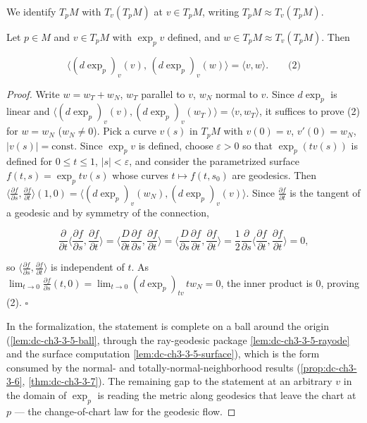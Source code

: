 \begin{lemma}[Gauss]
  \label{lem:dc-ch3-3-5}
  \notready
  We identify $T_pM$ with $T_v(T_pM)$ at $v\in T_pM$, writing $T_pM\approx T_v(T_pM)$.
  
  Let $p\in M$ and $v\in T_pM$ with $\exp_p v$ defined, and $w\in T_pM\approx T_v(T_pM)$.
  Then
  
  $$
  \langle(d\exp_p)_v(v),\,(d\exp_p)_v(w)\rangle=\langle v,w\rangle.\qquad\text{(2)}
  $$
\end{lemma}
\begin{proof}
  Write $w=w_T+w_N$, $w_T$ parallel to $v$, $w_N$ normal to $v$. Since
  $d\exp_p$ is linear and
  $\langle(d\exp_p)_v(v),(d\exp_p)_v(w_T)\rangle=\langle v,w_T\rangle$, it suffices
  to prove (2) for $w=w_N$ ($w_N\ne 0$). Pick a curve $v(s)$ in $T_pM$ with
  $v(0)=v$, $v'(0)=w_N$, $|v(s)|=\text{const}$. Since $\exp_p v$ is defined,
  choose $\varepsilon>0$ so that $\exp_p(tv(s))$ is defined for $0\le t\le 1$,
  $|s|<\varepsilon$, and consider the parametrized surface
  $f(t,s)=\exp_p tv(s)$ whose curves $t\mapsto f(t,s_0)$ are geodesics.
  Then $\langle\frac{\partial f}{\partial s},\frac{\partial f}{\partial t}\rangle(1,0)=\langle(d\exp_p)_v(w_N),(d\exp_p)_v(v)\rangle$.
  Since $\frac{\partial f}{\partial t}$ is the tangent of a geodesic and by symmetry
  of the connection,
  
  $$
  \frac{\partial}{\partial t}\Big\langle\frac{\partial f}{\partial s},\frac{\partial f}{\partial t}\Big\rangle=\Big\langle\frac{D}{\partial t}\frac{\partial f}{\partial s},\frac{\partial f}{\partial t}\Big\rangle=\Big\langle\frac{D}{\partial s}\frac{\partial f}{\partial t},\frac{\partial f}{\partial t}\Big\rangle=\frac12\frac{\partial}{\partial s}\Big\langle\frac{\partial f}{\partial t},\frac{\partial f}{\partial t}\Big\rangle=0,
  $$
  
  so $\langle\frac{\partial f}{\partial s},\frac{\partial f}{\partial t}\rangle$ is
  independent of $t$. As $\lim_{t\to0}\frac{\partial f}{\partial s}(t,0)=\lim_{t\to0}(d\exp_p)_{tv}\,t w_N=0$,
  the inner product is $0$, proving (2). $\square$

  In the formalization, the statement is complete on a ball around the
  origin (\cref{lem:dc-ch3-3-5-ball}, through the ray-geodesic package
  \cref{lem:dc-ch3-3-5-rayode} and the surface computation
  \cref{lem:dc-ch3-3-5-surface}), which is the form consumed by the normal-
  and totally-normal-neighborhood results
  (\cref{prop:dc-ch3-3-6}, \cref{thm:dc-ch3-3-7}). The remaining gap to the
  statement at an arbitrary $v$ in the domain of $\exp_p$ is reading the
  metric along geodesics that leave the chart at $p$ — the change-of-chart
  law for the geodesic flow.
\end{proof}

